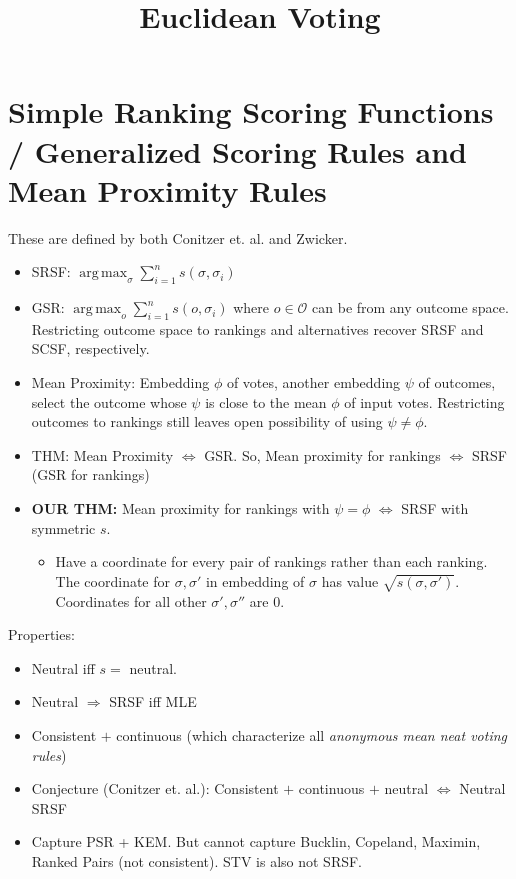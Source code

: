 \documentclass[10pt,letterpaper]{article}
\title{Euclidean Voting}
\DeclareMathOperator*{\argmax}{arg\,max}
\begin{document}
\maketitle


\section{Simple Ranking Scoring Functions / Generalized Scoring Rules and Mean Proximity Rules}

These are defined by both Conitzer et. al. and Zwicker. 
\begin{itemize}
\item SRSF: $\argmax_{\sigma} \sum_{i=1}^n s(\sigma,\sigma_i)$
\item GSR: $\argmax_{o} \sum_{i=1}^n s(o,\sigma_i)$ where $o \in \mathcal{O}$ can be from any outcome space. Restricting outcome space to rankings and alternatives recover SRSF and SCSF, respectively.
\item Mean Proximity: Embedding $\phi$ of votes, another embedding $\psi$ of outcomes, select the outcome whose $\psi$ is close to the mean $\phi$ of input votes. Restricting outcomes to rankings still leaves open possibility of using $\psi \neq \phi$. 
\item THM: Mean Proximity $\Leftrightarrow$ GSR. So, Mean proximity for rankings $\Leftrightarrow$ SRSF (GSR for rankings)
\item {\bf OUR THM:} Mean proximity for rankings with $\psi = \phi$ $\Leftrightarrow$ SRSF with symmetric $s$. 
	\begin{itemize}
	\item Have a coordinate for every pair of rankings rather than each ranking. The coordinate for $\sigma,\sigma'$ in embedding of $\sigma$ has value $\sqrt{s(\sigma,\sigma')}$. Coordinates for all other $\sigma',\sigma''$ are $0$. 
	\end{itemize}
\end{itemize}

Properties:
\begin{itemize}
\item Neutral iff $s = $ neutral. 
\item Neutral $\Rightarrow$ SRSF iff MLE
\item Consistent $+$ continuous (which characterize all \emph{anonymous mean neat voting rules})
\item Conjecture (Conitzer et. al.): Consistent $+$ continuous $+$ neutral $\Leftrightarrow$ Neutral SRSF
\item Capture PSR + KEM. But cannot capture Bucklin, Copeland, Maximin, Ranked Pairs (not consistent). STV is also not SRSF. 
\end{itemize}
\end{document}
